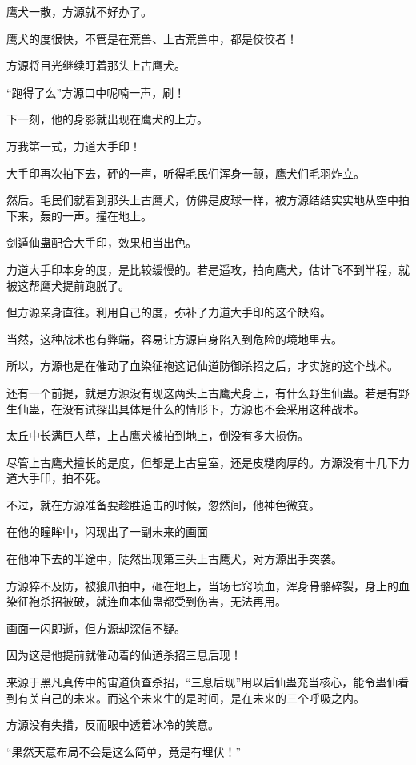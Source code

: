 \begin{this_body}
鹰犬一散，方源就不好办了。

鹰犬的度很快，不管是在荒兽、上古荒兽中，都是佼佼者！

方源将目光继续盯着那头上古鹰犬。

“跑得了么”方源口中呢喃一声，刷！

下一刻，他的身影就出现在鹰犬的上方。

万我第一式，力道大手印！

大手印再次拍下去，砰的一声，听得毛民们浑身一颤，鹰犬们毛羽炸立。

然后。毛民们就看到那头上古鹰犬，仿佛是皮球一样，被方源结结实实地从空中拍下来，轰的一声。撞在地上。

剑遁仙蛊配合大手印，效果相当出色。

力道大手印本身的度，是比较缓慢的。若是遥攻，拍向鹰犬，估计飞不到半程，就被这帮鹰犬提前跑脱了。

但方源亲身直往。利用自己的度，弥补了力道大手印的这个缺陷。

当然，这种战术也有弊端，容易让方源自身陷入到危险的境地里去。

所以，方源也是在催动了血染征袍这记仙道防御杀招之后，才实施的这个战术。

还有一个前提，就是方源没有现这两头上古鹰犬身上，有什么野生仙蛊。若是有野生仙蛊，在没有试探出具体是什么的情形下，方源也不会采用这种战术。

太丘中长满巨人草，上古鹰犬被拍到地上，倒没有多大损伤。

尽管上古鹰犬擅长的是度，但都是上古皇室，还是皮糙肉厚的。方源没有十几下力道大手印，拍不死。

不过，就在方源准备要趁胜追击的时候，忽然间，他神色微变。

在他的瞳眸中，闪现出了一副未来的画面

在他冲下去的半途中，陡然出现第三头上古鹰犬，对方源出手突袭。

方源猝不及防，被狼爪拍中，砸在地上，当场七窍喷血，浑身骨骼碎裂，身上的血染征袍杀招被破，就连血本仙蛊都受到伤害，无法再用。

画面一闪即逝，但方源却深信不疑。

因为这是他提前就催动着的仙道杀招三息后现！

来源于黑凡真传中的宙道侦查杀招，“三息后现”用以后仙蛊充当核心，能令蛊仙看到有关自己的未来。而这个未来生的是时间，是在未来的三个呼吸之内。

方源没有失措，反而眼中透着冰冷的笑意。

“果然天意布局不会是这么简单，竟是有埋伏！”


\end{this_body}
